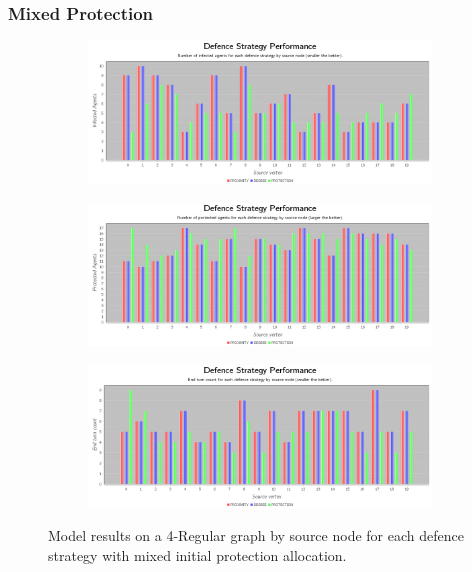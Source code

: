 \documentclass[results.tex]{subfiles}
\begin{document}
\newpage


\subsubsection{Mixed Protection}



\newpage

\begin{figure}[!ht]
\centering
     \begin{subfigure}[b]{0.9\textwidth}
         \centering
         \includegraphics[width=\textwidth]{4Regular/Mixed/MixedInfectedChart}
         \label{fig:4reg-mix-infected}
     \end{subfigure}
     \vfill
     \begin{subfigure}[b]{0.9\textwidth}
         \centering
         \includegraphics[width=\textwidth]{4Regular/Mixed/MixedProtectedChart}
         \label{fig:4reg-mix-protected}
     \end{subfigure}
     \vfill
     \begin{subfigure}[b]{0.9\textwidth}
         \centering
         \includegraphics[width=\textwidth]{4Regular/Mixed/MixedEndTurnChart}
         \label{fig:4reg-mix-end}
     \end{subfigure}
        \caption{Model results on a 4-Regular graph by source node for each defence strategy with mixed initial protection allocation.}
        \label{fig:4reg-mix-charts}
\end{figure}
\end{document}
